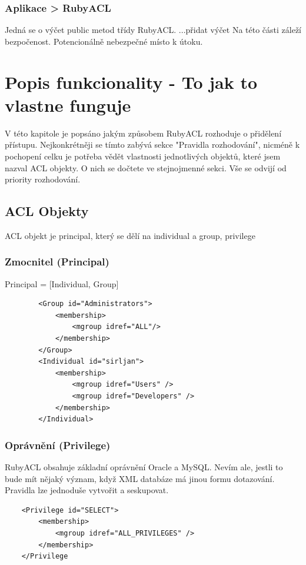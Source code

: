 \documentclass[11pt,twoside,a4paper]{book}
\begin{document}
\subsection{Aplikace > RubyACL}
Jedná se o výčet public metod třídy RubyACL.
...přidat výčet
Na této části záleží bezpočenost. Potencionálně nebezpečné místo k útoku.

\chapter{Popis funkcionality - To jak to vlastne funguje}
V této kapitole je popsáno jakým způsobem RubyACL rozhoduje o přidělení přístupu. Nejkonkrétněji se tímto zabývá sekce "Pravidla rozhodování", nicméně k pochopení celku je potřeba vědět vlastnosti jednotlivých objektů, které jsem nazval ACL objekty. O nich se dočtete ve stejnojmenné sekci.
Vše se odvijí od priority rozhodování.

\section{ACL Objekty}
ACL objekt je principal, který se dělí na individual a group, privilege

\subsection {Zmocnitel (Principal)}
Principal = [Individual, Group]
\begin{verbatim}
        <Group id="Administrators">
            <membership>
                <mgroup idref="ALL"/>
            </membership>
        </Group>
        <Individual id="sirljan">
            <membership>
                <mgroup idref="Users" />
                <mgroup idref="Developers" />
            </membership>
        </Individual>
\end{verbatim}

\subsection {Oprávnění (Privilege)}
RubyACL obsahuje základní oprávnění Oracle a MySQL. Nevím ale, jestli to bude mít nějaký význam, když XML databáze má jinou formu dotazování. 
Pravidla lze jednoduše vytvořit a seskupovat.
\begin{verbatim}
    <Privilege id="SELECT">
        <membership>             
            <mgroup idref="ALL_PRIVILEGES" />         
        </membership>
    </Privilege
\end{verbatim}
\end{document}
